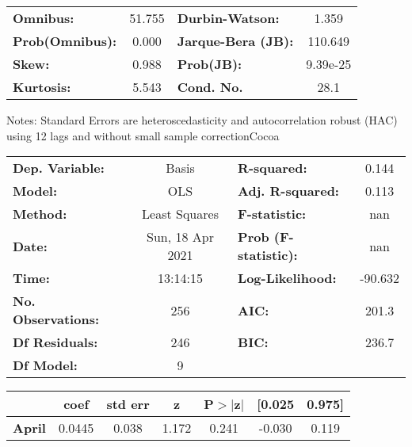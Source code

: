 \begin{center}
\begin{tabular}{lcccccc}
\bottomrule
\end{tabular}
\begin{tabular}{lclc}
\textbf{Omnibus:}       & 51.755 & \textbf{  Durbin-Watson:     } &    1.359  \\
\textbf{Prob(Omnibus):} &  0.000 & \textbf{  Jarque-Bera (JB):  } &  110.649  \\
\textbf{Skew:}          &  0.988 & \textbf{  Prob(JB):          } & 9.39e-25  \\
\textbf{Kurtosis:}      &  5.543 & \textbf{  Cond. No.          } &     28.1  \\
\bottomrule
\end{tabular}
\end{center}

Notes: \newline
 [1] Standard Errors are heteroscedasticity and autocorrelation robust (HAC) using 12 lags and without small sample correctionCocoa\begin{center}
\begin{tabular}{lclc}
\toprule
\textbf{Dep. Variable:}    &      Basis       & \textbf{  R-squared:         } &     0.144   \\
\textbf{Model:}            &       OLS        & \textbf{  Adj. R-squared:    } &     0.113   \\
\textbf{Method:}           &  Least Squares   & \textbf{  F-statistic:       } &       nan   \\
\textbf{Date:}             & Sun, 18 Apr 2021 & \textbf{  Prob (F-statistic):} &      nan    \\
\textbf{Time:}             &     13:14:15     & \textbf{  Log-Likelihood:    } &   -90.632   \\
\textbf{No. Observations:} &         256      & \textbf{  AIC:               } &     201.3   \\
\textbf{Df Residuals:}     &         246      & \textbf{  BIC:               } &     236.7   \\
\textbf{Df Model:}         &           9      & \textbf{                     } &             \\
\bottomrule
\end{tabular}
\begin{tabular}{lcccccc}
                   & \textbf{coef} & \textbf{std err} & \textbf{z} & \textbf{P$> |$z$|$} & \textbf{[0.025} & \textbf{0.975]}  \\
\midrule
\textbf{April}     &       0.0445  &        0.038     &     1.172  &         0.241        &       -0.030    &        0.119     \\

\end{tabular}
\end{center}
